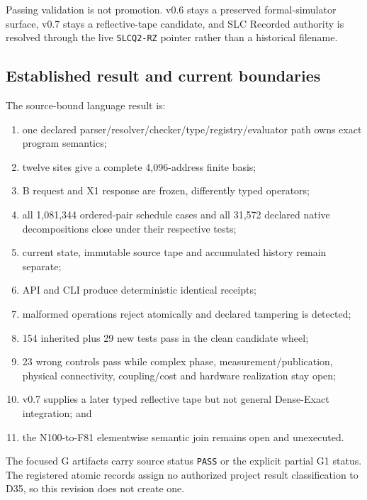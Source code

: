 Passing validation is not promotion. v0.6 stays a preserved
formal-simulator surface, v0.7 stays a reflective-tape candidate, and
SLC Recorded authority is resolved through the live \texttt{SLCQ2-RZ}
pointer rather than a historical filename.

\subsection{Established result and current
boundaries}\label{viii-ch02-established-result-and-current-boundaries}

The source-bound language result is:

\begin{enumerate}
\def\labelenumi{\arabic{enumi}.}
\tightlist
\item
  one declared parser/\allowbreak resolver/\allowbreak checker/\allowbreak type/\allowbreak registry/\allowbreak evaluator path owns
  exact program semantics;
\item
  twelve sites give a complete 4,096-address finite basis;
\item
  B request and X1 response are frozen, differently typed operators;
\item
  all 1,081,344 ordered-pair schedule cases and all 31,572 declared
  native decompositions close under their respective tests;
\item
  current state, immutable source tape and accumulated history remain
  separate;
\item
  API and CLI produce deterministic identical receipts;
\item
  malformed operations reject atomically and declared tampering is
  detected;
\item
  154 inherited plus 29 new tests pass in the clean candidate wheel;
\item
  23 wrong controls pass while complex phase, measurement/publication,
  physical connectivity, coupling/cost and hardware realization stay
  open;
\item
  v0.7 supplies a later typed reflective tape but not general
  Dense-Exact integration; and
\item
  the N100-to-F81 elementwise semantic join remains open and unexecuted.
\end{enumerate}

The focused G artifacts carry source status \texttt{PASS} or the
explicit partial G1 status. The registered atomic records assign no
authorized project result classification to D35, so this revision does
not create one.

